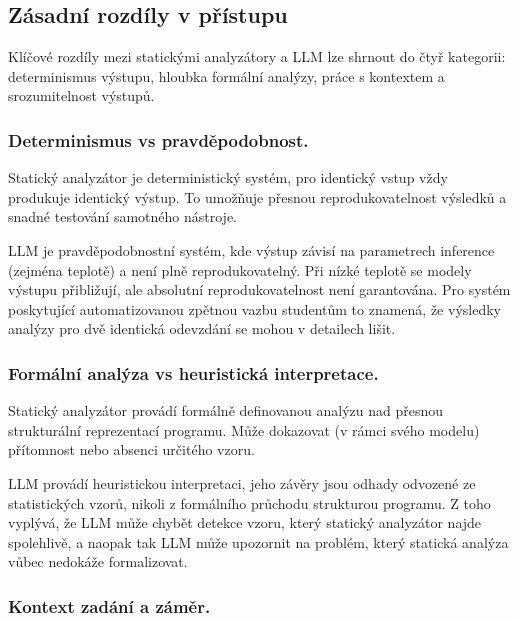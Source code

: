 \subsection{Zásadní rozdíly v přístupu}
\label{subsec:static-vs-llm-differences}

Klíčové rozdíly mezi statickými analyzátory a LLM lze shrnout do čtyř kategorii: determinismus výstupu, hloubka formální analýzy, práce s kontextem a srozumitelnost výstupů.

\subsubsection*{Determinismus vs pravděpodobnost.}
\label{subsubsec:determinism-vs-probability}

Statický analyzátor je deterministický systém, pro identický vstup vždy produkuje identický výstup.
To umožňuje přesnou reprodukovatelnost výsledků a snadné testování samotného nástroje.

LLM je pravděpodobnostní systém, kde výstup závisí na parametrech inference (zejména teplotě) a není plně reprodukovatelný.
Při nízké teplotě se modely výstupu přibližují, ale absolutní reprodukovatelnost není garantována.
Pro systém poskytující automatizovanou zpětnou vazbu studentům to znamená, že výsledky analýzy pro dvě identická odevzdání se mohou v detailech lišit.

\subsubsection*{Formální analýza vs heuristická interpretace.}
\label{subsubsec:formal-vs-heuristic}

Statický analyzátor provádí formálně definovanou analýzu nad přesnou strukturální reprezentací programu.
Může dokazovat (v rámci svého modelu) přítomnost nebo absenci určitého vzoru.

LLM provádí heuristickou interpretaci, jeho závěry jsou odhady odvozené ze statistických vzorů, nikoli z formálního průchodu strukturou programu.
Z toho vyplývá, že LLM může chybět detekce vzoru, který statický analyzátor najde spolehlivě, a naopak tak LLM může upozornit na problém, který statická analýza vůbec nedokáže formalizovat.

\subsubsection*{Kontext zadání a záměr.}
\label{subsubsec:context}

